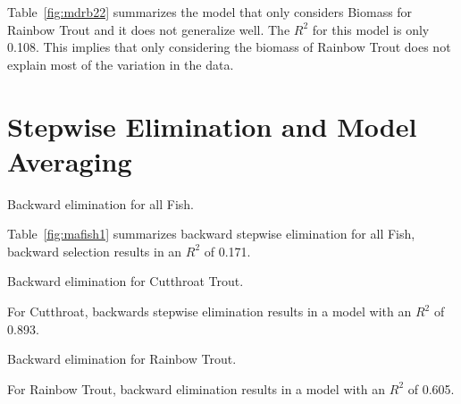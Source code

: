 Table~\ref{fig:mdrb22} summarizes the model that only considers Biomass for Rainbow Trout and it does not generalize well. The $R^{2}$ for this model is only 0.108. This implies that only considering the biomass of Rainbow Trout does not explain most of the variation in the data.





\section{Stepwise Elimination and Model Averaging}


\begin{table}[H]
 \begin{singlespace*}

\caption{\hspace{1mm}Backward elimination for all Fish.}
\label{fig:mafish1}
\end{singlespace*}
\end{table}



Table~\ref{fig:mafish1} summarizes backward stepwise elimination for all Fish, backward selection results in an $R^{2}$ of 0.171.



\begin{table}[H]
 \begin{singlespace*}

\caption{\hspace{1mm}Backward elimination for Cutthroat Trout.}
\label{fig:mdct32}
\end{singlespace*}
\end{table}



For Cutthroat, backwards stepwise elimination results in a model with an $R^{2}$ of 0.893.




\begin{table}[H]
 \begin{singlespace*}

\caption{\hspace{1mm}Backward elimination for Rainbow Trout.}
\label{fig:mdct32}
\end{singlespace*}
\end{table}


For Rainbow Trout, backward elimination results in a model with an $R^{2}$ of 0.605.






